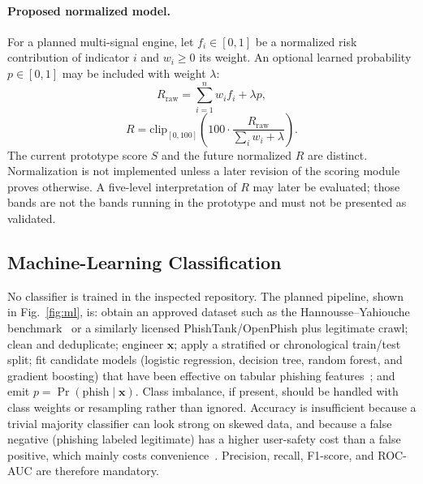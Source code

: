 \documentclass[conference]{IEEEtran}
\begin{document}
\paragraph{Proposed normalized model.}
For a planned multi-signal engine, let $f_i\in[0,1]$ be a normalized risk contribution of indicator $i$ and $w_i\ge 0$ its weight. An optional learned probability $p\in[0,1]$ may be included with weight $\lambda$:
\begin{equation}
R_{\mathrm{raw}}=\sum_{i=1}^{n} w_i f_i + \lambda p,
\label{eq:raw}
\end{equation}
\begin{equation}
R = \mathrm{clip}_{[0,100]}\!\left(100\cdot\frac{R_{\mathrm{raw}}}{\sum_i w_i + \lambda}\right).
\label{eq:norm}
\end{equation}
The current prototype score $S$ and the future normalized $R$ are distinct. Normalization is not implemented unless a later revision of the scoring module proves otherwise. A five-level interpretation of $R$ may later be evaluated; those bands are not the bands running in the prototype and must not be presented as validated.

\subsection{Machine-Learning Classification}
\label{sec:ml}
No classifier is trained in the inspected repository. The planned pipeline, shown in Fig.~\ref{fig:ml}, is: obtain an approved dataset such as the Hannousse--Yahiouche benchmark~\cite{hannousse2021benchmark} or a similarly licensed PhishTank/OpenPhish plus legitimate crawl; clean and deduplicate; engineer $\mathbf{x}$; apply a stratified or chronological train/test split; fit candidate models (logistic regression, decision tree, random forest, and gradient boosting) that have been effective on tabular phishing features~\cite{sahingoz2019ml,rao2019detection,hannousse2021benchmark}; and emit $p=\Pr(\mathrm{phish}\mid\mathbf{x})$. Class imbalance, if present, should be handled with class weights or resampling rather than ignored. Accuracy is insufficient because a trivial majority classifier can look strong on skewed data, and because a false negative (phishing labeled legitimate) has a higher user-safety cost than a false positive, which mainly costs convenience~\cite{xiang2011cantinaplus,sahingoz2019ml}. Precision, recall, F1-score, and ROC-AUC are therefore mandatory.
\end{document}
